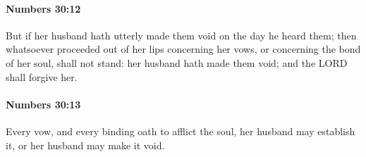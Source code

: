 		\paragraph{Numbers 30:12} %
			\label{NUMBERS-30-12}

			But if her husband hath utterly made them void on the day he heard them; then whatsoever proceeded out of her lips concerning her vows, or concerning the bond of her soul, shall not stand: her husband hath made them void; and the LORD shall forgive her.


		\paragraph{Numbers 30:13} %
			\label{NUMBERS-30-13}

			Every vow, and every binding oath to afflict the soul, her husband may establish it, or her husband may make it void.

